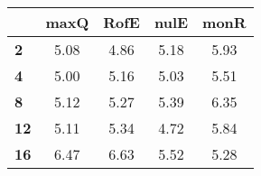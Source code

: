 \begin{tabular}{|l|c|c|c|c|}
\hline
&\textbf{maxQ}&\textbf{RofE}&\textbf{nulE}&\textbf{monR}\\\hline
\textbf{2}&5.08&4.86&5.18&5.93\\\hline
\textbf{4}&5.00&5.16&5.03&5.51\\\hline
\textbf{8}&5.12&5.27&5.39&6.35\\\hline
\textbf{12}&5.11&5.34&4.72&5.84\\\hline
\textbf{16}&6.47&6.63&5.52&5.28\\\hline
\end{tabular}
